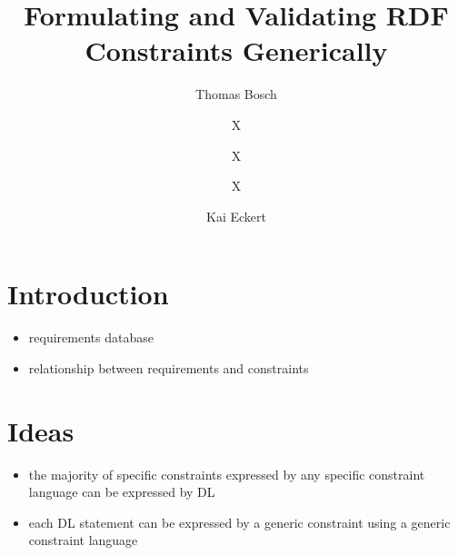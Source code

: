 \documentclass{llncs}
\begin{document}
%
%
\title{Formulating and Validating RDF Constraints Generically}
%
%
\author{Thomas Bosch \and X \and X \and X \and Kai Eckert}
%
%

\maketitle              %

\begin{abstract}


\end{abstract}
%


\section{Introduction}

\begin{itemize}
	\item requirements database
	\item relationship between requirements and constraints
\end{itemize}

\section{Ideas}

\begin{itemize}
	\item the majority of specific constraints expressed by any specific constraint language can be expressed by DL
	\item each DL statement can be expressed by a generic constraint using a generic constraint language
\end{itemize}
\end{document}
